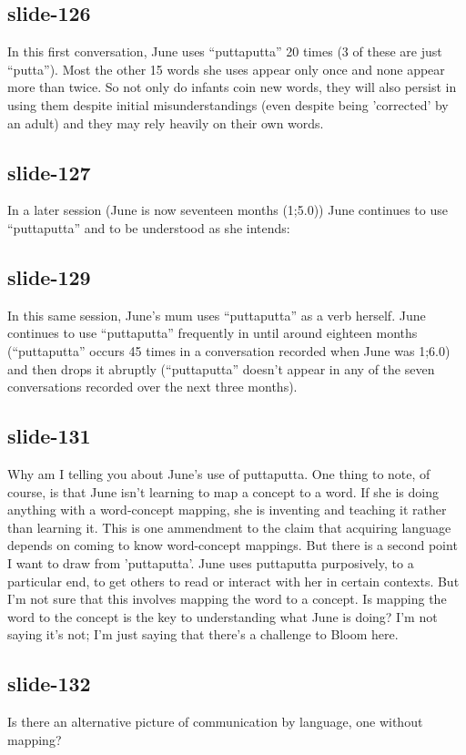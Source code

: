 \documentclass[12pt,\papersize]{extarticle}
\begin{document}
 
\subsection{slide-126}
In this first conversation, June uses “puttaputta” 20 times (3 of these are just “putta”). Most the other 15 words she uses appear only once and none appear more than twice.
So not only do infants coin new words, they will also persist in using them despite initial misunderstandings (even despite being 'corrected' by an adult) and they may rely heavily on their own words.
 
 
\subsection{slide-127}
In a later session (June is now seventeen months (1;5.0)) June continues to use “puttaputta” and to be understood as she intends:
 
 
\subsection{slide-129}
In this same session, June's mum uses “puttaputta” as a verb herself.
June continues to use “puttaputta” frequently in until around eighteen months (“puttaputta” occurs 45 times in a conversation recorded when June was 1;6.0) and then drops it abruptly (“puttaputta” doesn't appear in any of the seven conversations recorded over the next three months).
 
 
\subsection{slide-131}
Why am I telling you about June's use of puttaputta.
One thing to note, of course, is that June isn't learning to map a concept to a word.
If she is doing anything with a word-concept mapping, she is inventing and teaching it rather than learning it.
This is one ammendment to the claim that acquiring language depends on coming to know word-concept mappings.
But there is a second point I want to draw from 'puttaputta'.
June uses puttaputta purposively, to a particular end, to get others to read or interact with her in certain contexts.
But I'm not sure that this involves mapping the word to a concept.
Is mapping the word to the concept is the key to understanding what June is doing?
I'm not saying it's not; I'm just saying that there's a challenge to Bloom here.
 
 
\subsection{slide-132}
Is there an alternative picture of communication by language, one without mapping?
 
\end{document}
